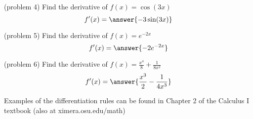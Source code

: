 \documentclass[handout]{ximera}
\begin{document}
\begin{problem} (problem 4)
Find the derivative of $f(x) = \cos(3x)$
\[
f'(x) = \answer{-3\sin(3x)}
\]
\end{problem}

\begin{problem} (problem 5)
Find the derivative of $f(x) = e^{-2x}$
\[
f'(x) = \answer{-2e^{-2x}}
\]
\end{problem}

\begin{problem} (problem 6)
Find the derivative of $\displaystyle f(x) =\frac{x^4}{8} + \frac{1}{8x^2} $
\[
f'(x) = \answer{\frac{x^3}{2} - \frac{1}{4x^3} }
\]
\end{problem}

Examples of the differentiation rules can be found in Chapter 2 of the 
Calculus I textbook (also at ximera.osu.edu/math)
\end{document}
